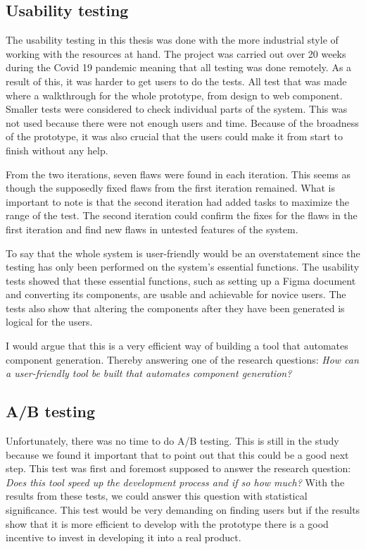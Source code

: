 \subsection{Usability testing}%
\label{sub:Usability testing}
The usability testing in this thesis was done with the more industrial style of working with the resources at hand. The project was carried out over 20 weeks during the Covid 19 pandemic meaning that all testing was done remotely. As a result of this, it was harder to get users to do the tests. All test that was made where a walkthrough for the whole prototype, from design to web component. Smaller tests were considered to check individual parts of the system. This was not used because there were not enough users and time. Because of the broadness of the prototype, it was also crucial that the users could make it from start to finish without any help. 

From the two iterations, seven flaws were found in each iteration. This seems as though the supposedly fixed flaws from the first iteration remained. What is important to note is that the second iteration had added tasks to maximize the range of the test. The second iteration could confirm the fixes for the flaws in the first iteration and find new flaws in untested features of the system. 

To say that the whole system is user-friendly would be an overstatement since the testing has only been performed on the system's essential functions. The usability tests showed that these essential functions, such as setting up a Figma document and converting its components, are usable and achievable for novice users. The tests also show that altering the components after they have been generated is logical for the users. 

I would argue that this is a very efficient way of building a tool that automates component generation. Thereby answering one of the research questions: \textit{How can a user-friendly tool be built that automates component generation?}



\subsection{A/B testing}%
\label{sub:A/B testing}
Unfortunately, there was no time to do A/B testing. This is still in the study because we found it important that to point out that this could be a good next step. This test was first and foremost supposed to answer the  research question: \textit{Does this tool speed up the development process and if so how much?} With the results from these tests, we could answer this question with statistical significance. This test would be very demanding on finding users but if the results show that it is more efficient to develop with the prototype there is a good incentive to invest in developing it into a real product. 

